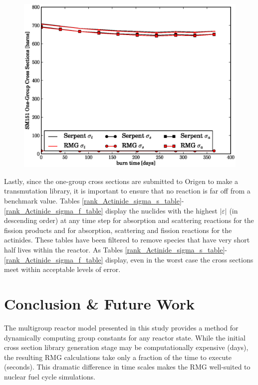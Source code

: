 \begin{figure}[htbp]
\begin{center}
\includegraphics[scale=0.3]{multigroup_method/figs/benchmark/SM151_1g_xs.eps}
\end{center}
\end{figure}

Lastly, since the one-group cross sections are submitted to Origen to make a transmutation library, 
it is important to ensure that no reaction is far off from a benchmark value.  Tables 
\ref{rank_Actinide_sigma_s_table}-\ref{rank_Actinide_sigma_f_table} display the 
nuclides with the highest $|\varepsilon|$ (in descending order) at any time step for absorption and scattering
reactions for the fission products and for absorption, scattering and fission reactions for the actinides.
These tables have been filtered to remove species that have very short half lives within the reactor.
As Tables \ref{rank_Actinide_sigma_s_table}-\ref{rank_Actinide_sigma_f_table} display, even in the worst case 
the cross sections meet within acceptable levels of error.








\section{Conclusion \& Future Work}
\label{mg_sec:conc}
The multigroup reactor model presented in this study provides a method for dynamically
computing group constants for any reactor state.  While the initial cross section library
generation stage may be computationally expensive (days), the resulting RMG calculations take
only a fraction of the time to execute (seconds).  This dramatic difference in time scales
makes the RMG well-suited to nuclear fuel cycle simulations.

